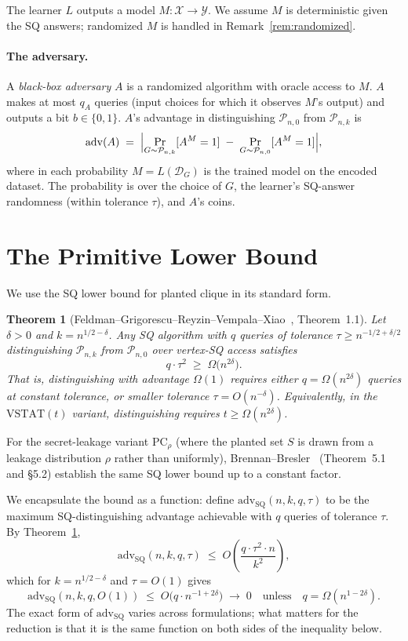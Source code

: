 \documentclass[11pt,a4paper]{article}
\newtheorem{theorem}{Theorem}
\theoremstyle{definition}
\theoremstyle{remark}
\newcommand{\Pnk}{\mathcal{P}_{n,k}}
\newcommand{\Pnzero}{\mathcal{P}_{n,0}}
\newcommand{\DG}{\mathcal{D}_G}
\newcommand{\Adv}{\mathrm{adv}}
\newcommand{\AdvSQ}{\Adv_{\mathrm{SQ}}}
\newcommand{\bits}{\{0,1\}}
\begin{document}
The learner $L$ outputs a model $M \colon \mathcal{X} \to \mathcal{Y}$. We assume $M$ is deterministic given the SQ answers; randomized $M$ is handled in Remark~\ref{rem:randomized}.

\paragraph{The adversary.}
A \emph{black-box adversary} $A$ is a randomized algorithm with oracle access to $M$. $A$ makes at most $q_A$ queries (input choices for which it observes $M$'s output) and outputs a bit $b \in \bits$. $A$'s advantage in distinguishing $\Pnzero$ from $\Pnk$ is
\[
\Adv(A) \;=\; \Bigl| \Pr_{G \sim \Pnk}[A^M = 1] \;-\; \Pr_{G \sim \Pnzero}[A^M = 1] \Bigr|,
\]
where in each probability $M = L(\DG)$ is the trained model on the encoded dataset. The probability is over the choice of $G$, the learner's SQ-answer randomness (within tolerance $\tau$), and $A$'s coins.

\section{The Primitive Lower Bound}

We use the SQ lower bound for planted clique in its standard form.

\begin{theorem}[Feldman--Grigorescu--Reyzin--Vempala--Xiao~\cite{FGRVX17}, Theorem~1.1]\label{thm:fgrvx}
Let $\delta > 0$ and $k = n^{1/2 - \delta}$. Any SQ algorithm with $q$ queries of tolerance $\tau \ge n^{-1/2 + \delta/2}$ distinguishing $\Pnk$ from $\Pnzero$ over vertex-SQ access satisfies
\[
q \cdot \tau^2 \;\ge\; \Omega\bigl(n^{2\delta}\bigr).
\]
That is, distinguishing with advantage $\Omega(1)$ requires either $q = \Omega(n^{2\delta})$ queries at constant tolerance, or smaller tolerance $\tau = O(n^{-\delta})$. Equivalently, in the $\mathrm{VSTAT}(t)$ variant, distinguishing requires $t \ge \Omega(n^{2\delta})$.
\end{theorem}

For the secret-leakage variant $\mathrm{PC}_{\rho}$ (where the planted set $S$ is drawn from a leakage distribution $\rho$ rather than uniformly), Brennan--Bresler~\cite{BB20} (Theorem~5.1 and \S5.2) establish the same SQ lower bound up to a constant factor.

We encapsulate the bound as a function: define $\AdvSQ(n, k, q, \tau)$ to be the maximum SQ-distinguishing advantage achievable with $q$ queries of tolerance $\tau$. By Theorem~\ref{thm:fgrvx},
\[
\AdvSQ(n, k, q, \tau) \;\le\; O\!\left(\frac{q \cdot \tau^2 \cdot n}{k^2}\right),
\]
which for $k = n^{1/2 - \delta}$ and $\tau = O(1)$ gives
\[
\AdvSQ(n, k, q, O(1)) \;\le\; O\bigl(q \cdot n^{-1 + 2\delta}\bigr) \;\to\; 0
\quad \text{unless} \quad q = \Omega(n^{1 - 2\delta}).
\]
The exact form of $\AdvSQ$ varies across formulations; what matters for the reduction is that it is the same function on both sides of the inequality below.
\end{document}

